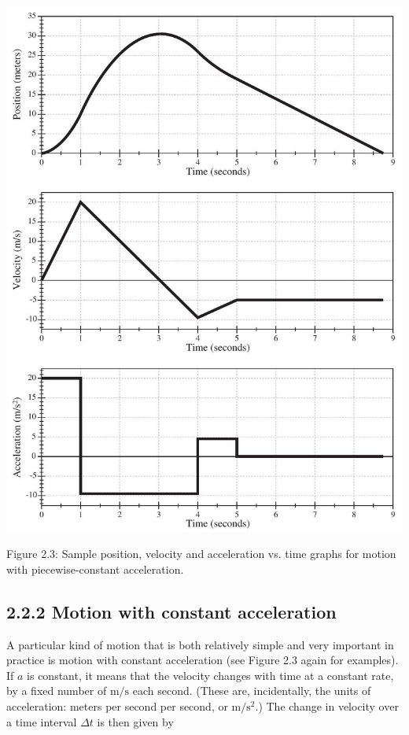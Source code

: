 \documentclass[10pt]{article}
\begin{document}
\begin{center}
\includegraphics[max width=\textwidth]{2024_09_14_9969b06773f10b6936e8g-056}
\end{center}

Figure 2.3: Sample position, velocity and acceleration vs. time graphs for motion with piecewise-constant acceleration.

\subsection*{2.2.2 Motion with constant acceleration}
A particular kind of motion that is both relatively simple and very important in practice is motion with constant acceleration (see Figure 2.3 again for examples). If $a$ is constant, it means that the velocity changes with time at a constant rate, by a fixed number of $\mathrm{m} / \mathrm{s}$ each second. (These are, incidentally, the units of acceleration: meters per second per second, or $\mathrm{m} / \mathrm{s}^{2}$.) The change in velocity over a time interval $\Delta t$ is then given by
\end{document}
